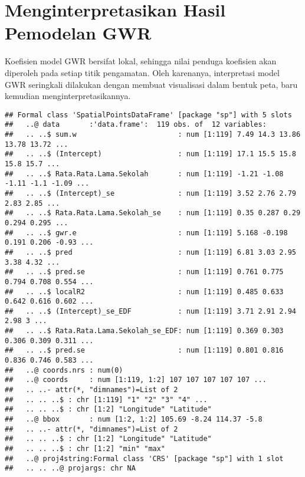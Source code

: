 \documentclass[
]{book}
\newenvironment{Shaded}{\begin{snugshade}}{\end{snugshade}}
\newcommand{\FunctionTok}[1]{\textcolor[rgb]{0.00,0.00,0.00}{#1}}
\newcommand{\NormalTok}[1]{#1}
\newcommand{\SpecialCharTok}[1]{\textcolor[rgb]{0.00,0.00,0.00}{#1}}
\begin{document}
\hypertarget{menginterpretasikan-hasil-pemodelan-gwr}{%
\section{Menginterpretasikan Hasil Pemodelan GWR}\label{menginterpretasikan-hasil-pemodelan-gwr}}

Koefisien model GWR bersifat lokal, sehingga nilai penduga koefisien akan diperoleh pada setiap titik pengamatan. Oleh karenanya, interpretasi model GWR seringkali dilakukan dengan membuat visualisasi dalam bentuk peta, baru kemudian menginterpretasikannya.

\begin{Shaded}
\end{Shaded}

\begin{verbatim}
## Formal class 'SpatialPointsDataFrame' [package "sp"] with 5 slots
##   ..@ data       :'data.frame':  119 obs. of  12 variables:
##   .. ..$ sum.w                        : num [1:119] 7.49 14.3 13.86 13.78 13.72 ...
##   .. ..$ (Intercept)                  : num [1:119] 17.1 15.5 15.8 15.8 15.7 ...
##   .. ..$ Rata.Rata.Lama.Sekolah       : num [1:119] -1.21 -1.08 -1.11 -1.1 -1.09 ...
##   .. ..$ (Intercept)_se               : num [1:119] 3.52 2.76 2.79 2.83 2.85 ...
##   .. ..$ Rata.Rata.Lama.Sekolah_se    : num [1:119] 0.35 0.287 0.29 0.294 0.295 ...
##   .. ..$ gwr.e                        : num [1:119] 5.168 -0.198 0.191 0.206 -0.93 ...
##   .. ..$ pred                         : num [1:119] 6.81 3.03 2.95 3.38 4.32 ...
##   .. ..$ pred.se                      : num [1:119] 0.761 0.775 0.794 0.708 0.554 ...
##   .. ..$ localR2                      : num [1:119] 0.485 0.633 0.642 0.616 0.602 ...
##   .. ..$ (Intercept)_se_EDF           : num [1:119] 3.71 2.91 2.94 2.98 3 ...
##   .. ..$ Rata.Rata.Lama.Sekolah_se_EDF: num [1:119] 0.369 0.303 0.306 0.309 0.311 ...
##   .. ..$ pred.se                      : num [1:119] 0.801 0.816 0.836 0.746 0.583 ...
##   ..@ coords.nrs : num(0) 
##   ..@ coords     : num [1:119, 1:2] 107 107 107 107 107 ...
##   .. ..- attr(*, "dimnames")=List of 2
##   .. .. ..$ : chr [1:119] "1" "2" "3" "4" ...
##   .. .. ..$ : chr [1:2] "Longitude" "Latitude"
##   ..@ bbox       : num [1:2, 1:2] 105.69 -8.24 114.37 -5.8
##   .. ..- attr(*, "dimnames")=List of 2
##   .. .. ..$ : chr [1:2] "Longitude" "Latitude"
##   .. .. ..$ : chr [1:2] "min" "max"
##   ..@ proj4string:Formal class 'CRS' [package "sp"] with 1 slot
##   .. .. ..@ projargs: chr NA
\end{verbatim}
\end{document}
